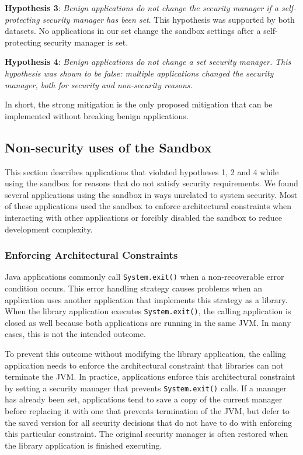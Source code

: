 \documentclass{sig-alternate}
\begin{document}
\textbf{Hypothesis 3}: \textit{Benign applications do not change the
security manager if a self-protecting security manager has been set}.
This hypothesis was supported by both datasets. No applications in
our set change the sandbox settings after a self-protecting security
manager is set.

\textbf{Hypothesis 4}:\textit{ Benign applications do not change a
set security manager. }\textit{\emph{This hypothesis was shown to
be false: multiple applications changed the security manager, both
for security and non-security reasons.}}

In short, the strong mitigation is the only proposed mitigation that
can be implemented without breaking benign applications.


\subsection{Non-security uses of the Sandbox}\label{sub:Non-security-uses-of}

This section describes applications that violated hypotheses 1, 2
and 4 while using the sandbox for reasons that do not satisfy security
requirements. We found several applications using the sandbox in ways
unrelated to system security. Most of these applications used the
sandbox to enforce architectural constraints when interacting with
other applications or forcibly disabled the sandbox to reduce development
complexity.


\subsubsection{Enforcing Architectural Constraints }

Java applications commonly call \texttt{System.exit()} when a non-recoverable
error condition occurs. This error handling strategy causes problems
when an application uses another application that implements this
strategy as a library. When the library application executes \texttt{System.exit()},
the calling application is closed as well because both applications
are running in the same JVM. In many cases, this is not the intended
outcome. 

To prevent this outcome without modifying the library application,
the calling application needs to enforce the architectural constraint
that libraries can not terminate the JVM. In practice, applications
enforce this architectural constraint by setting a security manager
that prevents \texttt{System.exit()} calls. If a manager has already
been set, applications tend to save a copy of the current manager
before replacing it with one that prevents termination of the JVM,
but defer to the saved version for all security decisions that do
not have to do with enforcing this particular constraint. The original
security manager is often restored when the library application is
finished executing.
\end{document}
